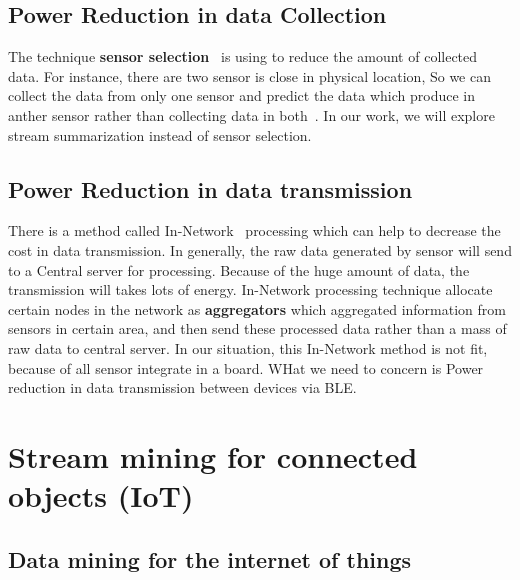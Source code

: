 \documentclass{report}
\begin{document}
\subsection{Power Reduction in data Collection}

The technique \textbf{sensor selection}~\cite{aggarwal2013managing} is using to reduce the amount of collected data. For instance, there are two sensor is close in physical location, So we can collect the data from only one sensor and predict the data which produce in anther sensor rather than collecting data in both~\cite{aggarwal2013managing}. In our work, we will explore stream summarization instead of sensor selection.

\subsection{Power Reduction in data transmission}

There is a method called In-Network~\cite{aggarwal2013managing} processing which can help to decrease the cost in data transmission. In generally, the raw data generated by sensor will send to
a Central server for processing. Because of the huge amount of data, the transmission will takes lots of energy. In-Network processing technique allocate certain nodes in the network as \textbf{aggregators} which aggregated information from sensors in certain area, and then send these processed data rather than a mass of raw data to central server. In our situation, this In-Network method is not fit, because of all sensor integrate in a board. WHat we need to concern is Power reduction in data transmission between devices via BLE.



\section{Stream mining for connected objects (IoT)}

\subsection{Data mining for the internet of things}
\end{document}
